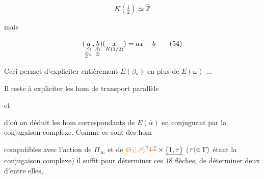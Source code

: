 \[
K(\tfrac12)\simeq\widehat{\mathbb Z}
\tag*{(53)}
\]

mais 

\[
(\underset{\substack{\rotatebox{-90}{$\in$}\\\widehat{\mathbb Z}^{\times}}}{a},
\underset{\substack{\rotatebox{-90}{$\in$}\\\mathbb Z}}{b})(\underset{K(1/2)}{x})=ax-b
\tag*{(54)}
\]

Ceci permet d'expliciter entièrement $E(\beta_*)$ en plus de $E(\omega)$ ...

Il reste  à expliciter les hom de transport parallèle


et




d'où on déduit les  hom correspondants de $E(\bar\alpha)$ en conjuguant par la conjugaison complexe. Comme ce sont des hom


compatibles avec l'action de $\Pi_\infty$ et de $\unsure{\mathfrak S_3|\mathscr S_3}\deleted{\unsure{\Gamma}}\times\underline{\{1,\tau\}}$ ($\tau\inserted{\in\Gamma}$ étant la conjugaison complexe) il suffit pour déterminer ces $18$ flèches, de déterminer deux d'entre elles,  

